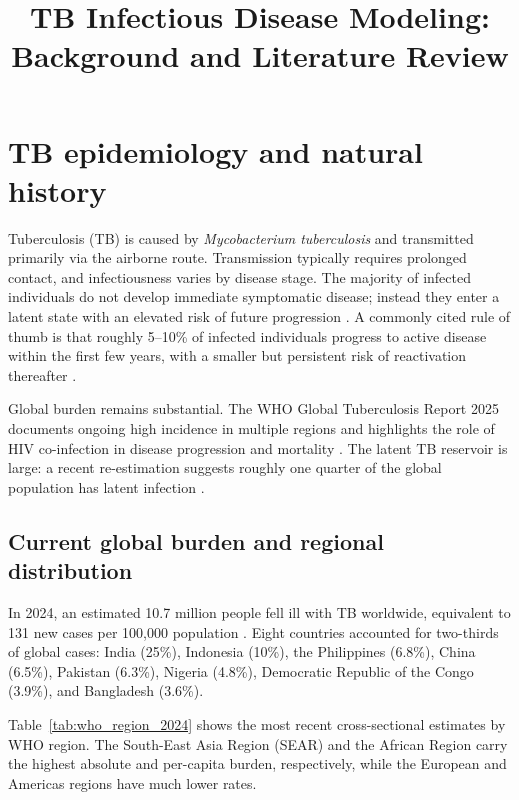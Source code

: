 \documentclass[11pt]{article}
\title{TB Infectious Disease Modeling: Background and Literature Review}
\author{}
\date{}
\begin{document}
\maketitle
\tableofcontents
\newpage

\section{TB epidemiology and natural history}
\label{sec:epi}

Tuberculosis (TB) is caused by \textit{Mycobacterium tuberculosis} and transmitted primarily via the airborne route. Transmission typically requires prolonged contact, and infectiousness varies by disease stage. The majority of infected individuals do not develop immediate symptomatic disease; instead they enter a latent state with an elevated risk of future progression \citep{vynnycky1997natural}. A commonly cited rule of thumb is that roughly 5--10\% of infected individuals progress to active disease within the first few years, with a smaller but persistent risk of reactivation thereafter \citep{vynnycky1997natural, who2025global}.

Global burden remains substantial. The WHO Global Tuberculosis Report 2025 documents ongoing high incidence in multiple regions and highlights the role of HIV co-infection in disease progression and mortality \citep{who2025global}. The latent TB reservoir is large: a recent re-estimation suggests roughly one quarter of the global population has latent infection \citep{houben2016latent}.

\subsection{Current global burden and regional distribution}

In 2024, an estimated 10.7 million people fell ill with TB worldwide, equivalent to 131 new cases per 100{,}000 population \citep{who2025global}. Eight countries accounted for two-thirds of global cases: India (25\%), Indonesia (10\%), the Philippines (6.8\%), China (6.5\%), Pakistan (6.3\%), Nigeria (4.8\%), Democratic Republic of the Congo (3.9\%), and Bangladesh (3.6\%).

Table~\ref{tab:who_region_2024} shows the most recent cross-sectional estimates by WHO region. The South-East Asia Region (SEAR) and the African Region carry the highest absolute and per-capita burden, respectively, while the European and Americas regions have much lower rates.
\end{document}
